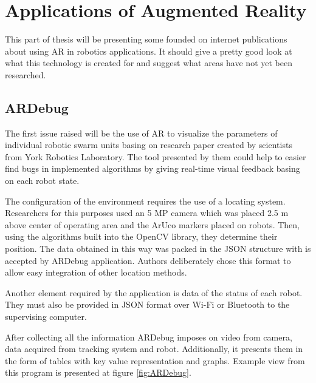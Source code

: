 \documentclass[printmode,en]{mgr}
\begin{document}
\begin{landscape}
\begin{table}[]
\centering
{}
\caption{Placeholder}
\label{tab:ARSoftware}
\end{table}
\end{landscape}

\chapter{Applications of Augmented Reality}
This part of thesis will be presenting some founded on internet publications about using AR in robotics applications. It should give a pretty good look at what this technology is created for and suggest what areas have not yet been researched.

\section{ARDebug}
The first issue raised will be the use of AR to visualize the parameters of individual robotic swarm units basing on research paper \cite{ARDebug} created by scientists from York Robotics Laboratory. The tool presented by them could help to easier find bugs in implemented algorithms by giving real-time visual feedback basing on each robot state.

The configuration of the environment requires the use of a locating system. Researchers for this purposes used an 5 MP camera which was placed 2.5 m above center of operating area and the ArUco markers placed on robots. Then, using the algorithms built into the OpenCV library, they determine their position. The data obtained in this way was packed in the JSON structure with is accepted by ARDebug application. Authors deliberately chose this format to allow easy integration of other location methods.

Another element required by the application is data of the status of each robot. They must also be provided in JSON format over Wi-Fi or Bluetooth to the supervising computer.

After collecting all the information ARDebug imposes on video from camera, data acquired from tracking system and robot. Additionally, it presents them in the form of tables with key value representation and graphs. Example view from this program is presented at figure \ref{fig:ARDebug}.
\end{document}
